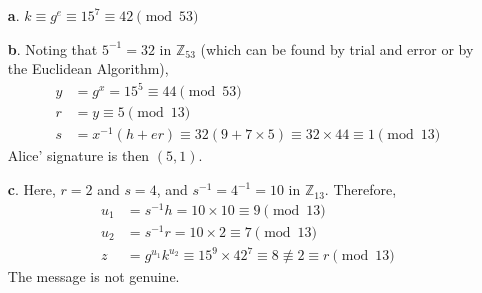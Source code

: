 \documentclass[11pt]{article}
\begin{document}
\bigskip{}
\begin{itemize}
  \item[{\bf a}.] $k \equiv g^e\equiv 15^7\equiv 42\pmod{53}$
  \item[{\bf b}.] Noting that $5^{-1} = 32$ in $\mathbb{Z}_{53}$
    (which can be found by trial and error or by the Euclidean Algorithm),
    \begin{align*}
      y &= g^x = 15^5\equiv 44\pmod{53}\\
      r &= y \equiv 5\pmod{13}\\
      s &= x^{-1}(h+er) \equiv 32(9+7\times 5) \equiv 32\times44 \equiv 1\pmod{13}
    \end{align*}
    Alice' signature is then $(5,1)$.
  \item[{\bf c}.]
    Here, $r = 2$ and $s = 4$,
    and $s^{-1} = 4^{-1} = 10$ in $\mathbb{Z}_{13}$.
    Therefore,
    \begin{align*}
      u_1 &= s^{-1}h = 10\times 10\equiv 9\pmod{13}\\
      u_2 &= s^{-1}r = 10\times  2\equiv 7\pmod{13}\\
      z   &= g^{u_1}k^{u_2} \equiv 15^9\times 42^{7} \equiv 8\not\equiv 2\equiv r\pmod{13}
    \end{align*}
    The message is not genuine.
\end{itemize}
\end{document}
